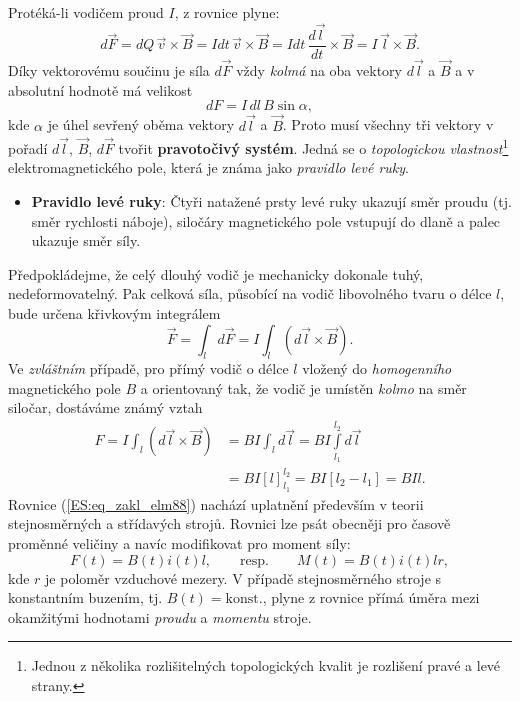       Protéká-li vodičem proud \(I\), z rovnice plyne:
      \begin{equation}\label{ES:eq_zakl_elm85}
        d\vec{F} =  dQ\,\vec{v}\times\vec{B} 
                 = Idt\,\vec{v}\times\vec{B} 
                 = Idt\,\frac{d\vec{l}}{dt}\times\vec{B}
                 = I\,\vec{l}\times\vec{B}.
      \end{equation}
      Díky vektorovému součinu je síla \(d\vec{F}\) vždy \emph{kolmá} na oba vektory \(d\vec{l}\) a 
      \(\vec{B}\) a v absolutní hodnotě má velikost
      \begin{equation}\label{ES:eq_zakl_elm86}
              dF=I\,dl\,B\sin\alpha,
      \end{equation}
      kde \(\alpha\) je úhel sevřený oběma vektory \(d\vec{l}\) a \(\vec{B}\). Proto musí všechny 
      tři vektory v pořadí \(d\vec{l}\), \(\vec{B}\), \(d\vec{F}\) tvořit \textbf{pravotočivý 
      systém}. Jedná se o \emph{topologickou vlastnost}\footnote{Jednou z několika rozlišitelných 
      topologických kvalit je rozlišení pravé a levé strany.} elektromagnetického pole, která je 
      známa jako \emph{pravidlo levé ruky}.
      \begin{itemize}
        \item \textbf{Pravidlo levé ruky}: Čtyři natažené prsty levé ruky ukazují směr proudu (tj. 
              směr rychlosti náboje), siločáry magnetického pole vstupují do dlaně a palec ukazuje 
              směr síly.
      \end{itemize}

      Předpokládejme, že celý dlouhý vodič je mechanicky dokonale tuhý, nedeformovatelný. Pak 
      celková síla, působící na vodič libovolného tvaru o délce \(l\), bude určena křivkovým 
      integrálem
      \begin{equation}\label{ES:eq_zakl_elm87}
        \vec{F} = \int_ld\vec{F} 
                = I\int_l (d\vec{l}\times\vec{B}).
      \end{equation}
      Ve \emph{zvláštním} případě, pro přímý vodič o délce \(l\) vložený do \emph{homogenního} 
      magnetického pole \(B\) a orientovaný tak, že vodič je umístěn \emph{kolmo} na směr siločar, 
      dostáváme známý vztah
      \begin{align}\label{ES:eq_zakl_elm88}
        F  =  I\int_l (d\vec{l}\times\vec{B})
          &= BI\int_l d\vec{l} = BI\int\limits_{l_1}^{l_2}d\vec{l}  \nonumber \\
          &= BI[l]_{l_1}^{l_2}
           = BI[l_2 - l_1]
           = BIl.
      \end{align}
      Rovnice (\ref{ES:eq_zakl_elm88}) nachází uplatnění především v teorii stejnosměrných a 
      střídavých strojů. Rovnici lze psát obecněji pro časově proměnné veličiny a navíc modifikovat 
      pro moment síly:
      \begin{equation}\label{ES:eq_zakl_elm89}
        F(t)=B(t)i(t)l, \qquad\text{resp.} \qquad M(t)=B(t)i(t)lr,
      \end{equation}
      kde \(r\) je poloměr vzduchové mezery. V případě stejnosměrného stroje s konstantním buzením, 
      tj. \(B(t) = \text{konst.}\), plyne z rovnice přímá úměra mezi okamžitými hodnotami 
      \emph{proudu} a \emph{momentu} stroje.


